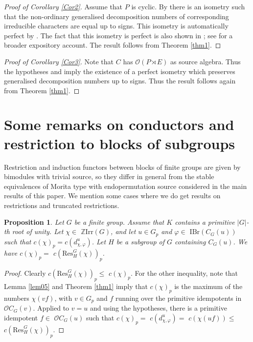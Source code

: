 \documentclass{amsart} %
\theoremstyle{plain}\newtheorem{Theorem}{Theorem}[section]
\theoremstyle{plain}\newtheorem{Conjecture}[Theorem]{Conjecture}
\theoremstyle{plain}\newtheorem{Corollary}[Theorem]{Corollary}
\theoremstyle{plain}\newtheorem{Lemma}[Theorem]{Lemma}
\theoremstyle{plain}\newtheorem{Proposition}[Theorem]{Proposition}
\theoremstyle{definition}\newtheorem{Definition}[Theorem]{Definition}
\theoremstyle{definition}\newtheorem{Example}[Theorem]{Example}
\theoremstyle{definition}\newtheorem{Examples}[Theorem]{Examples}
\theoremstyle{definition}\newtheorem{Remark}[Theorem]{Remark}
\theoremstyle{definition}\newtheorem{Remarks}[Theorem]{Remarks}
\theoremstyle{plain}\newtheorem{Statement}[Theorem]{}
\def\CO{{\mathcal{O}}}
\def\Z{{\mathbb Z}}
\def\IBr{\mathrm{IBr}}
\def\Irr{\mathrm{Irr}}           \def\tenK{\otimes_K}
\def\Res{\mathrm{Res}}           \def\tenOR{\otimes_{\mathcal{O}R}}
\begin{document}
\begin{proof}[Proof of Corollary \ref{Cor2}]
Assume that $P$ is cyclic. By \cite[Th\'eor\`eme (13.2), Th\'eor\`eme (13.6)]{Lithese}
there is an isometry such that the non-ordinary generalised decomposition numbers
of corresponding irreducible characters are equal up to signs. This isometry is
automatically perfect by \cite[Proposition 3.3]{KL10}. The fact that this isometry
is perfect  is also shown  in \cite{Licycliccentre};  see 
\cite[Theorem 11.1.14]{LiBookII} for a broader expository account.
The result follows from Theorem \ref{thm1}.
\end{proof}


 \begin{proof}[Proof of Corollary \ref{Cor3}]
Note that $C$ has $\CO(P\rtimes E)$ as source algebra. Thus the hypotheses
and \cite[Theorem 5.10.5]{LiBookII} imply the existence of a perfect isometry
which preserves generalised decomposition numbers up to signs.
Thus the result follows again from Theorem \ref{thm1}.
\end{proof}

 

\section{Some remarks on conductors and restriction to blocks of subgroups}%
\label{Res-Section}

Restriction and induction functors between blocks of finite groups
are given by bimodules with trivial source, so they differ in general from the
stable equivalences of Morita type with endopermutation source considered
in the main results of this paper. We mention some cases where we do get
results on restrictions and truncated restrictions.

\begin{Proposition} \label{PropIntro1}
Let $G$ be a finite group. Assume that $K$ contains a primitive $|G|$-th root 
of unity.  Let $\chi\in$ $\Z\Irr(G)$, and let  $u\in G_p$ and $\varphi\in$
$\IBr(C_G(u))$ such that $c(\chi)_p=c(d^u_{\chi,\varphi})$.
Let  $H$ be a subgroup of $G$ containing $C_G(u)$. We have
$c(\chi)_p =$ $c(\Res^G_H(\chi))_p$.
\end{Proposition}

\begin{proof}
 Clearly $c(\Res^G_H(\chi))_p\leq$
$c(\chi)_p$. For the other inequality, note that Lemma \ref{lem05} and 
Theorem \ref{thm1} imply that $c(\chi)_p$ is the maximum of the numbers
$\chi(vf)$, with $v\in G_p$ and $f$ running over the primitive idempotents
in $\CO C_G(v)$. Applied to $v=u$ and using the hypotheses, there is
a primitive idempotent $f\in$ $\CO C_G(u)$ such that
$c(\chi)_p=$ $c(d^u_{\chi,\varphi}) =$ $c(\chi(uf)) \leq$ $c(\Res^G_H(\chi))_p$.
\end{proof}
\end{document}
